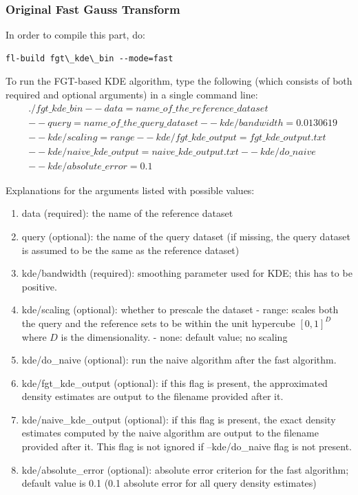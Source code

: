 \documentclass[letter]{report}
\begin{document}
\subsubsection{Original Fast Gauss Transform}
In order to compile this part, do: 
\begin{verbatim}
fl-build fgt\_kde\_bin --mode=fast
\end{verbatim}

 To run the FGT-based KDE algorithm, type the
following (which consists of both required and optional arguments) in
a single command line:
\begin{align*}
& \mathit{./fgt\_kde\_bin} \
\mathit{--data=name\_of\_the\_reference\_dataset}\\ &
\mathit{--query=name\_of\_the\_query\_dataset} \
\mathit{--kde/bandwidth=0.0130619} \\ & \mathit{--kde/scaling=range} \
\mathit{--kde/fgt\_kde\_output=fgt\_kde\_output.txt}\\ &
\mathit{--kde/naive\_kde\_output=naive\_kde\_output.txt} \
\mathit{--kde/do\_naive}\\ & \mathit{--kde/absolute\_error=0.1}
\end{align*}

Explanations for the arguments listed with possible values:

\begin{enumerate}
\item{data (required): the name of the reference dataset}
\item{query (optional): the name of the query dataset (if missing, the
 query dataset is assumed to be the same as the reference dataset)}
\item{kde/bandwidth (required): smoothing parameter used for KDE; this
 has to be positive.}
\item{kde/scaling (optional): whether to prescale the dataset - range:
scales both the query and the reference sets to be within the unit
hypercube $[0, 1]^D$ where $D$ is the dimensionality.  - none: default
value; no scaling}
\item{kde/do\_naive (optional): run the naive algorithm after the fast
algorithm.}
\item{kde/fgt\_kde\_output (optional): if this flag is present, the
approximated density estimates are output to the filename provided
after it.}
\item{kde/naive\_kde\_output (optional): if this flag is present, the
 exact density estimates computed by the naive algorithm are output to
 the filename provided after it. This flag is not ignored if
 --kde/do\_naive flag is not present.}
\item{kde/absolute\_error (optional): absolute error criterion for the
 fast algorithm; default value is 0.1 (0.1 absolute error for all
 query density estimates)}
\end{enumerate}
\end{document}
